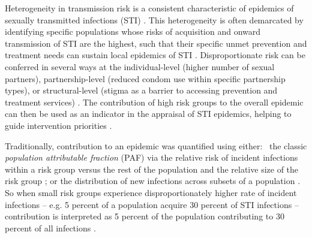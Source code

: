 Heterogeneity in transmission risk is a consistent characteristic of
epidemics of sexually transmitted infections (STI) \citep{Anderson1991}.
This heterogeneity is often demarcated by identifying
specific populations whose risks of acquisition and onward transmission of STI are the highest,
such that their specific unmet prevention and treatment needs
can sustain local epidemics of STI \citep{Yorke1978}.
Disproportionate risk can be conferred in several ways at the
individual-level (higher number of sexual partners), 
partnership-level (reduced condom use within specific partnership types), 
or structural-level (stigma as a barrier to accessing prevention and treatment services)
\citep{Baral2013}.
The contribution of high risk groups to the overall epidemic
can then be used as an indicator in the appraisal of STI epidemics,
helping to guide intervention priorities
\citep{Shubber2014,Mishra2016}.
\par
Traditionally, contribution to an epidemic was quantified using either:\ %
the classic \textit{population attributable fraction} (PAF)
via the relative risk of incident infections within a risk group
versus the rest of the population
and the relative size of the risk group \citep{Hanley2001};
or the distribution of new infections across subsets of a population
\citep{Case2012,Mishra2014}.
So when small risk groups experience disproportionately higher rate of
incident infections -- e.g. 5 percent of a population acquire 30 percent
of STI infections -- contribution is interpreted as 5 percent of the population contributing to
30 percent of all infections \citep{Pruss-Ustun2013}.
